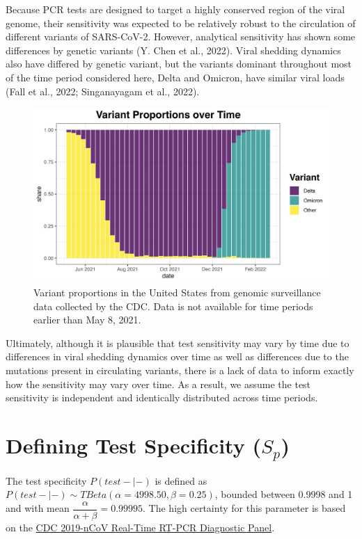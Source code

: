 \documentclass[12pt,twoside]{smiththesis}
\begin{document}
Because PCR tests are designed to target a highly conserved region of the viral genome, their sensitivity was expected to be relatively robust to the circulation of different variants of SARS-CoV-2. However, analytical sensitivity has shown some differences by genetic variants (Y. Chen et al., 2022). Viral shedding dynamics also have differed by genetic variant, but the variants dominant throughout most of the time period considered here, Delta and Omicron, have similar viral loads (Fall et al., 2022; Singanayagam et al., 2022).
\begin{figure}
\includegraphics[width=0.8\linewidth]{./figure/variant_plot} \caption{Variant proportions in the United States from genomic surveillance data collected by the CDC. Data is not available for time periods earlier than May 8, 2021.}\label{fig:unnamed-chunk-40}
\end{figure}
Ultimately, although it is plausible that test sensitivity may vary by time due to differences in viral shedding dynamics over time as well as differences due to the mutations present in circulating variants, there is a lack of data to inform exactly how the sensitivity may vary over time. As a result, we assume the test sensitivity is independent and identically distributed across time periods.

\hypertarget{defining-test-specificity-s_p}{%
\section{\texorpdfstring{Defining Test Specificity (\(S_p\))}{Defining Test Specificity (S\_p)}}\label{defining-test-specificity-s_p}}

The test specificity \(P(test -| -)\) is defined as \(P(test -|- )\sim TBeta(\alpha = 4998.50, \beta = 0.25)\), bounded between 0.9998 and 1 and with mean \(\dfrac{\alpha}{\alpha + \beta} = 0.99995\). The high certainty for this parameter is based on the \href{https://www.fda.gov/media/134922/download}{CDC 2019-nCoV Real-Time RT-PCR Diagnostic Panel}.
\end{document}
